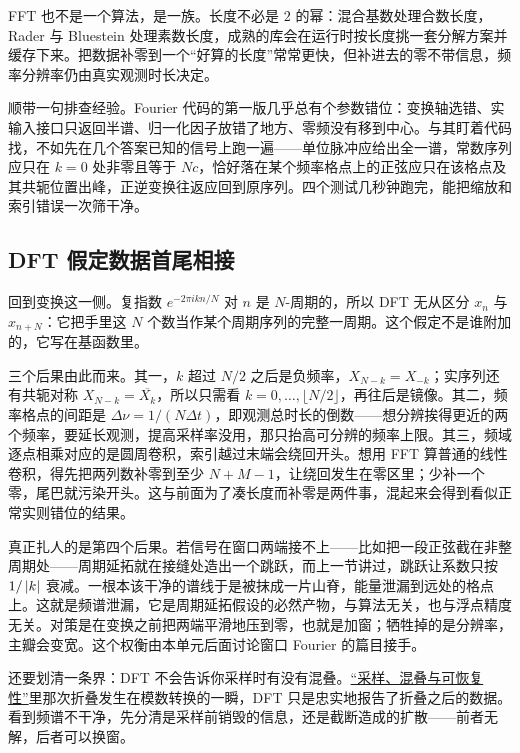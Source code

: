 FFT 也不是一个算法，是一族。长度不必是 \(2\) 的幂：混合基数处理合数长度，Rader 与 Bluestein 处理素数长度，成熟的库会在运行时按长度挑一套分解方案并缓存下来。把数据补零到一个``好算的长度''常常更快，但补进去的零不带信息，频率分辨率仍由真实观测时长决定。

顺带一句排查经验。Fourier 代码的第一版几乎总有个参数错位：变换轴选错、实输入接口只返回半谱、归一化因子放错了地方、零频没有移到中心。与其盯着代码找，不如先在几个答案已知的信号上跑一遍——单位脉冲应给出全一谱，常数序列应只在 \(k=0\) 处非零且等于 \(Nc\)，恰好落在某个频率格点上的正弦应只在该格点及其共轭位置出峰，正逆变换往返应回到原序列。四个测试几秒钟跑完，能把缩放和索引错误一次筛干净。

\subsection{DFT 假定数据首尾相接}

回到变换这一侧。复指数 \(e^{-2\pi ikn/N}\) 对 \(n\) 是 \(N\)-周期的，所以 DFT 无从区分 \(x_n\) 与 \(x_{n+N}\)：它把手里这 \(N\) 个数当作某个周期序列的完整一周期。这个假定不是谁附加的，它写在基函数里。

三个后果由此而来。其一，\(k\) 超过 \(N/2\) 之后是负频率，\(X_{N-k}=X_{-k}\)；实序列还有共轭对称 \(X_{N-k}=\overline{X_k}\)，所以只需看 \(k=0,\dots,\lfloor N/2\rfloor\)，再往后是镜像。其二，频率格点的间距是 \(\Delta\nu=1/(N\Delta t)\)，即观测总时长的倒数——想分辨挨得更近的两个频率，要延长观测，提高采样率没用，那只抬高可分辨的频率上限。其三，频域逐点相乘对应的是圆周卷积，索引越过末端会绕回开头。想用 FFT 算普通的线性卷积，得先把两列数补零到至少 \(N+M-1\)，让绕回发生在零区里；少补一个零，尾巴就污染开头。这与前面为了凑长度而补零是两件事，混起来会得到看似正常实则错位的结果。

真正扎人的是第四个后果。若信号在窗口两端接不上——比如把一段正弦截在非整周期处——周期延拓就在接缝处造出一个跳跃，而上一节讲过，跳跃让系数只按 \(1/\left|k\right|\) 衰减。一根本该干净的谱线于是被抹成一片山脊，能量泄漏到远处的格点上。这就是频谱泄漏，它是周期延拓假设的必然产物，与算法无关，也与浮点精度无关。对策是在变换之前把两端平滑地压到零，也就是加窗；牺牲掉的是分辨率，主瓣会变宽。这个权衡由本单元后面讨论窗口 Fourier 的篇目接手。

还要划清一条界：DFT 不会告诉你采样时有没有混叠。\hyperref[sec:08-Numerical-Analysis/08-Fourier-and-Spectral-Methods/02]{``采样、混叠与可恢复性''}里那次折叠发生在模数转换的一瞬，DFT 只是忠实地报告了折叠之后的数据。看到频谱不干净，先分清是采样前销毁的信息，还是截断造成的扩散——前者无解，后者可以换窗。

